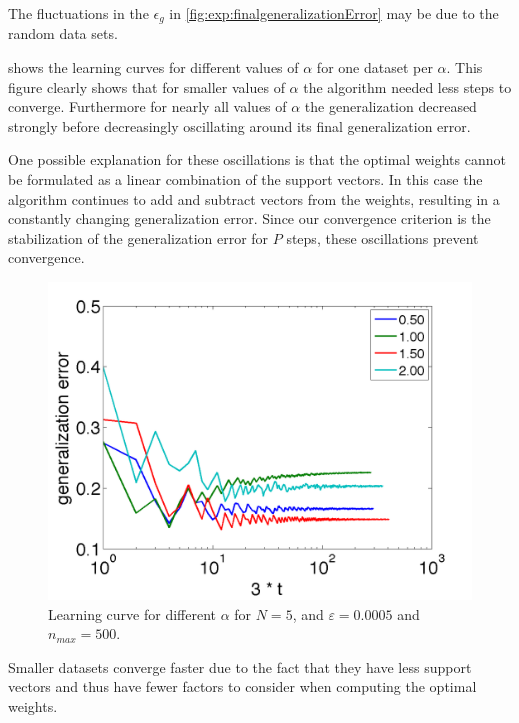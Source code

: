 The fluctuations in the $\epsilon_g$ in \cref{fig:exp:finalgeneralizationError} may be due to the random data sets. 

 shows the learning curves for different values of $\alpha$ for one dataset per $\alpha$. This figure clearly shows that for smaller values of $\alpha$ the algorithm needed less steps to converge. Furthermore for nearly all values of $\alpha$ the generalization decreased strongly before decreasingly oscillating around its final generalization error.

One possible explanation for these oscillations is that the optimal weights cannot be formulated as a linear combination of the support vectors. In this case the algorithm continues to add and subtract vectors from the weights, resulting in a constantly changing generalization error. Since our convergence criterion is the stabilization of the generalization error for $P$ steps, these oscillations prevent convergence. 

\begin{figure}
	\centering
	\includegraphics[width=0.9\columnwidth]{./img/N5NMAX500error3}
	\caption{Learning curve for different $\alpha$ for $N = 5$, and $\varepsilon = 0.0005$ and $n_{max} = 500$.}
	\label{fig:exp:learningcurve}
\end{figure}

Smaller datasets converge faster due to the fact that they have less support vectors and thus have fewer factors to consider when computing the optimal weights. 